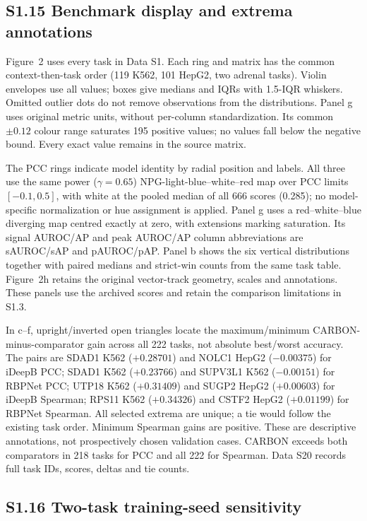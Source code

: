 \documentclass[11pt]{article}
\begin{document}
\subsection*{S1.15 Benchmark display and extrema annotations}

Figure~2 uses every task in Data S1. Each ring and matrix has the common context-then-task order (119 K562, 101 HepG2, two adrenal tasks). Violin envelopes use all values; boxes give medians and IQRs with 1.5-IQR whiskers. Omitted outlier dots do not remove observations from the distributions. Panel g uses original metric units, without per-column standardization. Its common $\pm0.12$ colour range saturates 195 positive values; no values fall below the negative bound. Every exact value remains in the source matrix.

The PCC rings indicate model identity by radial position and labels. All three use the same power ($\gamma=0.65$) NPG-light-blue--white--red map over PCC limits $[-0.1,0.5]$, with white at the pooled median of all 666 scores (0.285); no model-specific normalization or hue assignment is applied. Panel g uses a red--white--blue diverging map centred exactly at zero, with extensions marking saturation. Its signal AUROC/AP and peak AUROC/AP column abbreviations are sAUROC/sAP and pAUROC/pAP. Panel b shows the six vertical distributions together with paired medians and strict-win counts from the same task table. Figure~2h retains the original vector-track geometry, scales and annotations. These panels use the archived scores and retain the comparison limitations in S1.3.

In c--f, upright/inverted open triangles locate the maximum/minimum CARBON-minus-comparator gain across all 222 tasks, not absolute best/worst accuracy. The pairs are SDAD1 K562 ($+0.28701$) and NOLC1 HepG2 ($-0.00375$) for iDeepB PCC; SDAD1 K562 ($+0.23766$) and SUPV3L1 K562 ($-0.00151$) for RBPNet PCC; UTP18 K562 ($+0.31409$) and SUGP2 HepG2 ($+0.00603$) for iDeepB Spearman; RPS11 K562 ($+0.34326$) and CSTF2 HepG2 ($+0.01199$) for RBPNet Spearman. All selected extrema are unique; a tie would follow the existing task order. Minimum Spearman gains are positive. These are descriptive annotations, not prospectively chosen validation cases. CARBON exceeds both comparators in 218 tasks for PCC and all 222 for Spearman. Data S20 records full task IDs, scores, deltas and tie counts.

\subsection*{S1.16 Two-task training-seed sensitivity}
\end{document}
